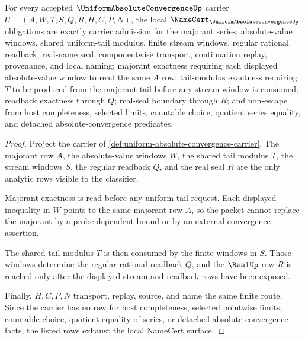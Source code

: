 \begin{theorem}
\label{thm:uniform-absolute-convergence-namecert-obligations}
For every accepted $\UniformAbsoluteConvergenceUp$ carrier $U=(A,W,T,S,Q,R,H,C,P,N)$, the local $\NameCert_{\UniformAbsoluteConvergenceUp}$ obligations are exactly carrier admission for the majorant series, absolute-value windows, shared uniform-tail modulus, finite stream windows, regular rational readback, real-name seal, componentwise transport, continuation replay, provenance, and local naming; majorant exactness requiring each displayed absolute-value window to read the same $A$ row; tail-modulus exactness requiring $T$ to be produced from the majorant tail before any stream window is consumed; readback exactness through $Q$; real-seal boundary through $R$; and non-escape from host completeness, selected limits, countable choice, quotient series equality, and detached absolute-convergence predicates.
\end{theorem}
\begin{proof}
Project the carrier of \autoref{def:uniform-absolute-convergence-carrier}. The majorant row $A$, the absolute-value windows $W$, the shared tail modulus $T$, the stream windows $S$, the regular readback $Q$, and the real seal $R$ are the only analytic rows visible to the classifier.

Majorant exactness is read before any uniform tail request. Each displayed inequality in $W$ points to the same majorant row $A$, so the packet cannot replace the majorant by a probe-dependent bound or by an external convergence assertion.

The shared tail modulus $T$ is then consumed by the finite windows in $S$. Those windows determine the regular rational readback $Q$, and the $\RealUp$ row $R$ is reached only after the displayed stream and readback rows have been exposed.

Finally, $H,C,P,N$ transport, replay, source, and name the same finite route. Since the carrier has no row for host completeness, selected pointwise limits, countable choice, quotient equality of series, or detached absolute-convergence facts, the listed rows exhaust the local NameCert surface.
\end{proof}


